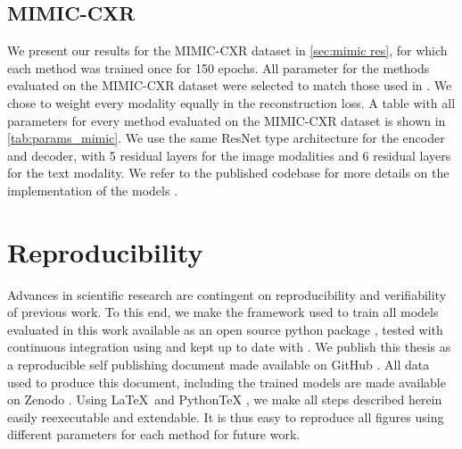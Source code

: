 
\subsection{MIMIC-CXR}
We present our results for the MIMIC-CXR dataset in \cref{sec:mimic res}, for which each method was trained once for 150 epochs.
All parameter for the methods evaluated on the MIMIC-CXR dataset were selected to match those used in \citep{klug_multimodal_nodate}.
We chose to weight every modality equally in the reconstruction loss.
A table with all parameters for every method evaluated on the MIMIC-CXR dataset is shown in \cref{tab:params_mimic}.
We use the same ResNet \citep{he2016deep} type architecture for the encoder and decoder, with 5 residual layers for the image modalities and 6 residual layers for the text modality.
We refer to the published codebase for more details on the implementation of the models \citep{mmvae_github}.



\section{Reproducibility}
Advances in scientific research are contingent on reproducibility and verifiability of previous work.
To this end, we make the framework used to train all models evaluated in this work available as an open source python package \citep{mmvae_github}, tested with continuous integration using \citep{travis} and kept up to date with \citep{dependabot}.
We publish this thesis as a reproducible self publishing document \citep[\href{https://github.com/TheChymera/RepSeP}{RepSeP}]{repsep} made available on GitHub \citep{mmnf_repsep}.
All data used to produce this document, including the trained models are made available on Zenodo \citep{mmnfdataset}.
Using \LaTeX\ and PythonTeX \citep{pytex}, we make all steps described herein easily reexecutable and extendable.
It is thus easy to reproduce all figures using different parameters for each method for future work.
